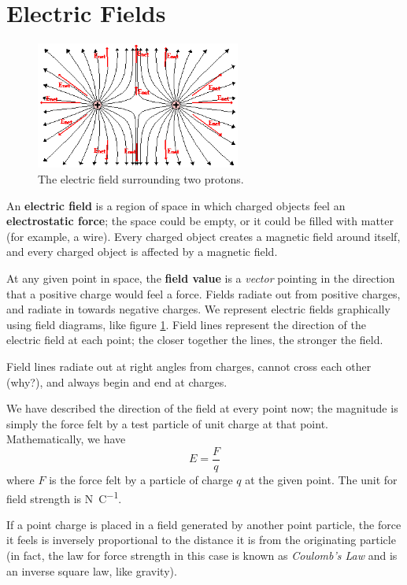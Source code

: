 \documentclass[a4paper]{amsbook}
\newcommand\capcite[1]{}
\begin{document}
\section{Electric Fields}
\begin{figure}
  \centering
  \includegraphics[width=0.6\textwidth]{fieldlines}
  \caption{The electric field surrounding two protons. \capcite{http://www.physicsclassroom.com/Class/estatics/u8l4c7.gif}\label{fig:fieldlines}}
\end{figure}
An \textbf{electric field} is a region of space in which charged objects feel an \textbf{electrostatic force}; the
space could be empty, or it could be filled with matter (for example, a wire). Every charged object creates a magnetic
field around itself, and every charged object is affected by a magnetic field.

At any given point in space, the \textbf{field value} is a \textit{vector} pointing in the direction that a positive
charge would feel a force. Fields radiate out from positive charges, and radiate in towards negative charges. We
represent electric fields graphically using field diagrams, like figure \ref{fig:fieldlines}. Field lines represent the direction of
the electric field at each point; the closer together the lines, the stronger the field.

Field lines radiate out at right angles from charges, cannot cross each other (why?), and always begin and end at charges.

We have described the direction of the field at every point now; the magnitude is simply the force felt by a test particle
of unit charge at that point. Mathematically, we have
\begin{equation}
  E = \frac{F}{q}
\end{equation}
where $ F $ is the force felt by a particle of charge $ q $ at the given point. The unit for field strength is \si{\newton\per\coulomb}.

If a point charge is placed in a field generated by another point particle, the force it feels is inversely proportional to the distance
it is from the originating particle (in fact, the law for force strength in this case is known as \textit{Coulomb's Law} and is an inverse
square law, like gravity).
\end{document}
